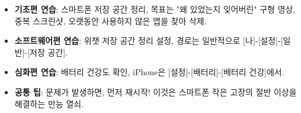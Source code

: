 
\begin{itemize}
  \item \textbf{기초편 연습}: 스마트폰 저장 공간 정리, 목표는 "왜 있었는지 잊어버린" 구형 영상, 중복 스크린샷, 오랫동안 사용하지 않은 앱을 찾아 삭제.
  \item \textbf{소프트웨어편 연습}: 위챗 저장 공간 정리 설정, 경로는 일반적으로 [나]-[설정]-[일반]-[저장 공간].
  \item \textbf{심화편 연습}: 배터리 건강도 확인, iPhone은 [설정]-[배터리]-[배터리 건강]에서.
  \item \textbf{공통 팁}: 문제가 발생하면, 먼저 재시작! 이것은 스마트폰 작은 고장의 절반 이상을 해결하는 만능 열쇠.
\end{itemize}
